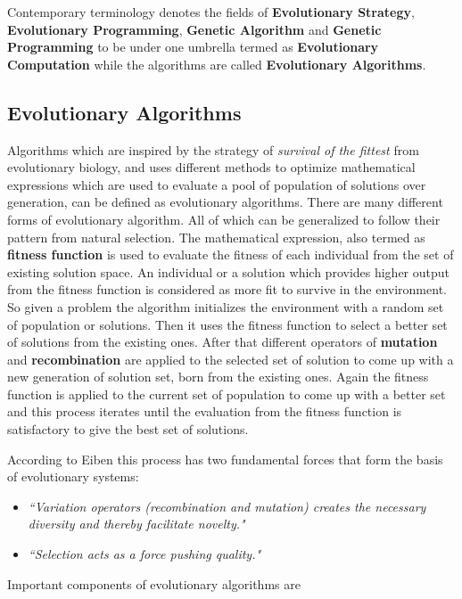 Contemporary terminology denotes the fields of \textbf{Evolutionary Strategy}, \textbf{Evolutionary Programming}, \textbf{Genetic Algorithm} and \textbf{Genetic Programming} to be under one umbrella termed as \textbf{Evolutionary Computation} while the algorithms are called \textbf{Evolutionary Algorithms}.

\subsection{Evolutionary Algorithms}
Algorithms which are inspired by the strategy of \textit{survival of the fittest} from evolutionary biology, and uses different methods to optimize mathematical expressions which are used to evaluate a pool of population of solutions over generation, can be defined as evolutionary algorithms. There are many different forms of evolutionary algorithm. All of which can be generalized to follow their pattern from natural selection. The mathematical expression, also termed as \textbf{fitness function} is used to evaluate the fitness of each individual from the set of existing solution space. An individual or a solution which provides higher output from the fitness function is considered as more fit to survive in the environment. So given a problem the algorithm initializes the environment with a random set of population or solutions. Then it uses the fitness function to select a better set of solutions from the existing ones. After that different operators of \textbf{mutation} and \textbf{recombination} are applied to the selected set of solution to come up with a new generation of solution set, born from the existing ones. Again the fitness function is applied to the current set of population to come up with a better set and this process iterates until the evaluation from the fitness function is satisfactory to give the best set of solutions.

According to Eiben \cite{eiben2003} this process has two fundamental forces that form the basis of evolutionary systems:

\begin{itemize}
	\item \textsl{``Variation operators (recombination and mutation) creates the necessary diversity and thereby facilitate novelty."}
	\item \textsl{``Selection acts as a force pushing quality."}
\end{itemize}

Important components of evolutionary algorithms are

